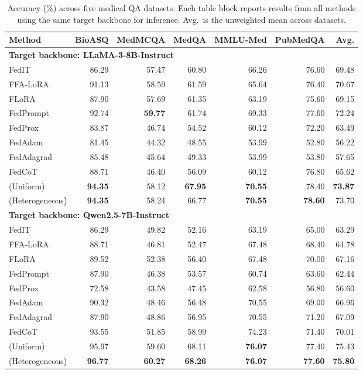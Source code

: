 \begin{table}[!t]
\centering\small
\setlength{\tabcolsep}{3.7pt}
\begin{tabular}{lrrrrrr}
\toprule
Method & BioASQ & MedMCQA & MedQA & MMLU-Med & PubMedQA & Avg. \\
\midrule
\multicolumn{7}{l}{\textbf{Target backbone: LLaMA-3-8B-Instruct}} \\
FedIT & 86.29 & 57.47 & 60.80 & 66.26 & 76.60 & 69.48 \\
FFA-LoRA & 91.13 & 58.59 & 61.59 & 65.64 & 76.40 & 70.67 \\
FLoRA & 87.90 & 57.69 & 61.35 & 63.19 & 75.60 & 69.15 \\
FedPrompt & 92.74 & \textbf{59.77} & 61.74 & 69.33 & 77.60 & 72.24 \\
FedProx & 83.87 & 46.74 & 54.52 & 60.12 & 72.20 & 63.49 \\
FedAdam & 81.45 & 44.32 & 48.55 & 53.99 & 52.80 & 56.22 \\
FedAdagrad & 85.48 & 45.64 & 49.33 & 53.99 & 53.80 & 57.65 \\
FedCoT & 88.71 & 46.40 & 56.09 & 60.12 & 76.80 & 65.62 \\
\rowcolor{oursrow} \ours{} (Uniform) & \textbf{94.35} & 58.12 & \textbf{67.95} & \textbf{70.55} & 78.40 & \textbf{73.87} \\
\rowcolor{oursrow} \ours{} (Heterogeneous) & \textbf{94.35} & 58.24 & 66.77 & \textbf{70.55} & \textbf{78.60} & 73.70 \\
\midrule
\multicolumn{7}{l}{\textbf{Target backbone: Qwen2.5-7B-Instruct}} \\
FedIT & 86.29 & 49.82 & 52.16 & 63.19 & 65.00 & 63.29 \\
FFA-LoRA & 88.71 & 46.81 & 52.47 & 67.48 & 68.40 & 64.78 \\
FLoRA & 89.52 & 52.38 & 56.40 & 67.48 & 70.00 & 67.16 \\
FedPrompt & 87.90 & 46.38 & 53.57 & 60.74 & 63.60 & 62.44 \\
FedProx & 72.58 & 43.58 & 47.45 & 62.58 & 56.80 & 56.60 \\
FedAdam & 90.32 & 48.46 & 56.48 & 70.55 & 69.00 & 66.96 \\
FedAdagrad & 87.90 & 48.86 & 56.95 & 70.55 & 71.20 & 67.09 \\
FedCoT & 93.55 & 51.85 & 58.99 & 74.23 & 71.40 & 70.01 \\
\rowcolor{oursrow} \ours{} (Uniform) & 95.97 & 59.60 & 68.11 & \textbf{76.07} & 77.40 & 75.43 \\
\rowcolor{oursrow} \ours{} (Heterogeneous) & \textbf{96.77} & \textbf{60.27} & \textbf{68.26} & \textbf{76.07} & \textbf{77.60} & \textbf{75.80} \\
\bottomrule
\end{tabular}
\caption{Accuracy (\%) across five medical QA datasets. Each table block reports results from all methods using the same target backbone for inference. Avg.\ is the unweighted mean across datasets.}
\label{tab:main}
\end{table}
